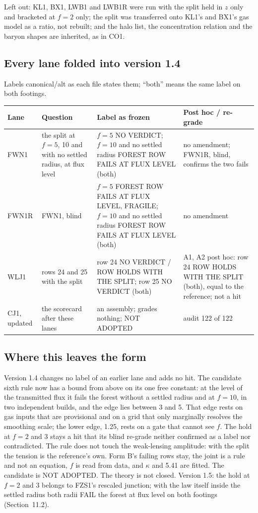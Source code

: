 \documentclass[10pt]{article}
\begin{document}
Left out: KL1, BX1, LWB1 and LWB1R were run with the split held in $z$ only and bracketed at $f=2$ only; the split was transferred onto KL1's and BX1's gas model as a ratio, not rebuilt; and the halo list, the concentration relation and the baryon shapes are inherited, as in CO1.

\subsection{Every lane folded into version 1.4}
Labels canonical/alt as each file states them; ``both'' means the same label on both footings.
{\footnotesize
\begin{longtable}{@{}p{1.9cm}p{3.6cm}p{5.6cm}p{4.6cm}@{}}\toprule
Lane & Question & Label as frozen & Post hoc / re-grade\\\midrule\endhead
FWN1 & the split at $f=5$, 10 and with no settled radius, at flux level & $f=5$ NO VERDICT; $f=10$ and no settled radius FOREST ROW FAILS AT FLUX LEVEL (both) & no amendment; FWN1R, blind, confirms the two fails\\
FWN1R & FWN1, blind & $f=5$ FOREST ROW FAILS AT FLUX LEVEL, FRAGILE; $f=10$ and no settled radius FOREST ROW FAILS AT FLUX LEVEL (both) & no amendment\\
WLJ1 & rows 24 and 25 with the split & row 24 NO VERDICT / ROW HOLDS WITH THE SPLIT; row 25 NO VERDICT (both) & A1, A2 post hoc: row 24 ROW HOLDS WITH THE SPLIT (both), equal to the reference; not a hit\\
CJ1, updated & the scorecard after these lanes & an assembly; grades nothing; NOT ADOPTED & audit 122 of 122\\\bottomrule
\end{longtable}}

\subsection{Where this leaves the form}
Version 1.4 changes no label of an earlier lane and adds no hit. The candidate sixth rule now has a bound from above on its one free constant: at the level of the transmitted flux it fails the forest without a settled radius and at $f=10$, in two independent builds, and the edge lies between 3 and 5. That edge rests on gas inputs that are provisional and on a grid that only marginally resolves the smoothing scale; the lower edge, 1.25, rests on a gate that cannot see $f$. The hold at $f=2$ and 3 stays a hit that its blind re-grade neither confirmed as a label nor contradicted. The rule does not touch the weak-lensing amplitude: with the split the tension is the reference's own. Form B's failing rows stay, the joint is a rule and not an equation, $f$ is read from data, and $\kappa$ and 5.41 are fitted. The candidate is NOT ADOPTED. The theory is not closed. Version 1.5: the hold at $f=2$ and 3 belongs to FZS1's rescaled junction; with the law itself inside the settled radius both radii FAIL the forest at flux level on both footings (Section~11.2).
\end{document}
